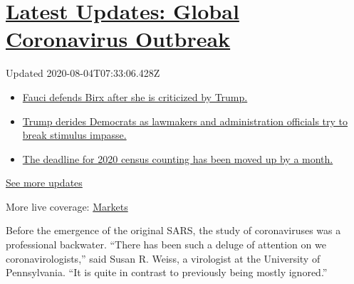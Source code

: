 \hypertarget{latest-updates-global-coronavirus-outbreak}{%
\section{\texorpdfstring{\href{https://www.nytimes.com/2020/08/03/world/coronavirus-covid-19.html?action=click\&pgtype=Article\&state=default\&region=MAIN_CONTENT_1\&context=storylines_live_updates}{Latest
Updates: Global Coronavirus
Outbreak}}{Latest Updates: Global Coronavirus Outbreak}}\label{latest-updates-global-coronavirus-outbreak}}

Updated 2020-08-04T07:33:06.428Z

\begin{itemize}
\tightlist
\item
  \href{https://www.nytimes.com/2020/08/03/world/coronavirus-covid-19.html?action=click\&pgtype=Article\&state=default\&region=MAIN_CONTENT_1\&context=storylines_live_updates\#link-4547638f}{Fauci
  defends Birx after she is criticized by Trump.}
\item
  \href{https://www.nytimes.com/2020/08/03/world/coronavirus-covid-19.html?action=click\&pgtype=Article\&state=default\&region=MAIN_CONTENT_1\&context=storylines_live_updates\#link-15e7f995}{Trump
  derides Democrats as lawmakers and administration officials try to
  break stimulus impasse.}
\item
  \href{https://www.nytimes.com/2020/08/03/world/coronavirus-covid-19.html?action=click\&pgtype=Article\&state=default\&region=MAIN_CONTENT_1\&context=storylines_live_updates\#link-e5a2cda}{The
  deadline for 2020 census counting has been moved up by a month.}
\end{itemize}

\href{https://www.nytimes.com/2020/08/03/world/coronavirus-covid-19.html?action=click\&pgtype=Article\&state=default\&region=MAIN_CONTENT_1\&context=storylines_live_updates}{See
more updates}

More live coverage:
\href{https://www.nytimes.com/live/2020/08/03/business/stock-market-today-coronavirus?action=click\&pgtype=Article\&state=default\&region=MAIN_CONTENT_1\&context=storylines_live_updates}{Markets}

Before the emergence of the original SARS, the study of coronaviruses
was a professional backwater. ``There has been such a deluge of
attention on we coronavirologists,'' said Susan R. Weiss, a virologist
at the University of Pennsylvania. ``It is quite in contrast to
previously being mostly ignored.''

